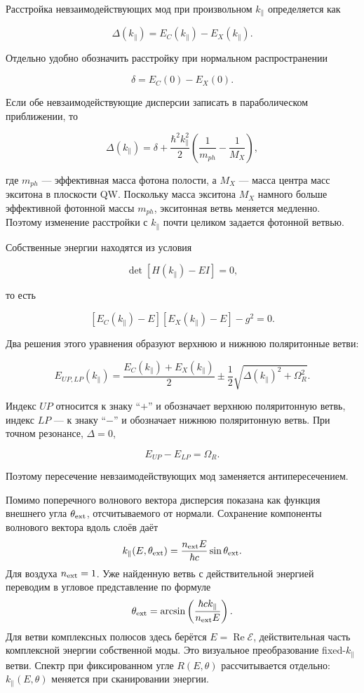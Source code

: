 \documentclass[12pt,a4paper]{article}
\begin{document}
Расстройка невзаимодействующих мод при произвольном $k_\parallel$ определяется как

\[
\Delta(k_\parallel)
=
E_C(k_\parallel)-E_X(k_\parallel).
\]

Отдельно удобно обозначить расстройку при нормальном распространении

\[
\delta
=
E_C(0)-E_X(0).
\]

Если обе невзаимодействующие дисперсии записать в параболическом приближении, то

\[
\Delta(k_\parallel)
=
\delta
+
\frac{\hbar^2k_\parallel^2}{2}
\left(
\frac{1}{m_{ph}}-\frac{1}{M_X}
\right),
\]

где $m_{ph}$ --- эффективная масса фотона полости, а $M_X$ --- масса центра масс экситона в плоскости QW. Поскольку масса экситона $M_X$ намного больше эффективной фотонной массы $m_{ph}$, экситонная ветвь меняется медленно. Поэтому изменение расстройки с $k_\parallel$ почти целиком задается фотонной ветвью.

Собственные энергии находятся из условия

\[
\det\!\left[H(k_\parallel)-E I\right]=0,
\]

то есть

\[
\left[E_C(k_\parallel)-E\right]
\left[E_X(k_\parallel)-E\right]
-g^2=0.
\]

Два решения этого уравнения образуют верхнюю и нижнюю поляритонные ветви:

\[
E_{UP,LP}(k_\parallel)
=
\frac{E_C(k_\parallel)+E_X(k_\parallel)}{2}
\pm
\frac12
\sqrt{\Delta(k_\parallel)^2+\Omega_R^2}.
\]

Индекс $UP$ относится к знаку ``$+$'' и обозначает верхнюю поляритонную ветвь, индекс $LP$ --- к знаку ``$-$'' и обозначает нижнюю поляритонную ветвь. При точном резонансе, $\Delta=0$,

\[
E_{UP}-E_{LP}=\Omega_R.
\]

Поэтому пересечение невзаимодействующих мод заменяется антипересечением.


Помимо поперечного волнового вектора дисперсия показана как функция внешнего угла
$\theta_{\rm ext}$, отсчитываемого от нормали. Сохранение компоненты волнового
вектора вдоль слоёв даёт
\[
k_\parallel(E,\theta_{\rm ext})
=\frac{n_{\rm ext}E}{\hbar c}\sin\theta_{\rm ext}.
\]
Для воздуха $n_{\rm ext}=1$. Уже найденную ветвь с действительной энергией
переводим в угловое представление по формуле
\[
\theta_{\rm ext}=\arcsin\left(\frac{\hbar c k_\parallel}{n_{\rm ext}E}\right).
\]
Для ветви комплексных полюсов здесь берётся $E=\operatorname{Re}\mathcal E$,
действительная часть комплексной энергии собственной моды. Это визуальное
преобразование fixed-$k_\parallel$ ветви. Спектр при фиксированном угле
$R(E,\theta)$ рассчитывается отдельно: $k_\parallel(E,\theta)$ меняется при
сканировании энергии.
\end{document}
